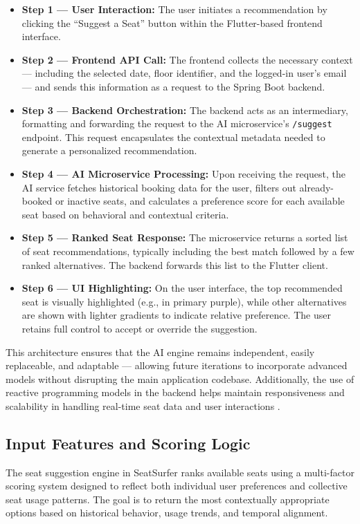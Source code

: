 \documentclass[12pt,a4paper]{report} %
\begin{document}
\begin{itemize}
\item \textbf{Step 1 — User Interaction:}
The user initiates a recommendation by clicking the “Suggest a Seat” button within the Flutter-based frontend interface.
\item \textbf{Step 2 — Frontend API Call:}  
The frontend collects the necessary context — including the selected date, floor identifier, and the logged-in user's email — and sends this information as a request to the Spring Boot backend.
\item \textbf{Step 3 — Backend Orchestration:}  
The backend acts as an intermediary, formatting and forwarding the request to the AI microservice's \texttt{/suggest} endpoint. This request encapsulates the contextual metadata needed to generate a personalized recommendation.
\item \textbf{Step 4 — AI Microservice Processing:}  
Upon receiving the request, the AI service fetches historical booking data for the user, filters out already-booked or inactive seats, and calculates a preference score for each available seat based on behavioral and contextual criteria.
\item \textbf{Step 5 — Ranked Seat Response:}  
The microservice returns a sorted list of seat recommendations, typically including the best match followed by a few ranked alternatives. The backend forwards this list to the Flutter client.
\item \textbf{Step 6 — UI Highlighting:}  
On the user interface, the top recommended seat is visually highlighted (e.g., in primary purple), while other alternatives are shown with lighter gradients to indicate relative preference. The user retains full control to accept or override the suggestion.
\end{itemize}

This architecture ensures that the AI engine remains independent, easily replaceable, and adaptable — allowing future iterations to incorporate advanced models without disrupting the main application codebase. Additionally, the use of reactive programming models in the backend helps maintain responsiveness and scalability in handling real-time seat data and user interactions \cite{huang2023reactive}.

\subsection{Input Features and Scoring Logic}

The seat suggestion engine in SeatSurfer ranks available seats using a multi-factor scoring system designed to reflect both individual user preferences and collective seat usage patterns. The goal is to return the most contextually appropriate options based on historical behavior, usage trends, and temporal alignment.
\end{document}
